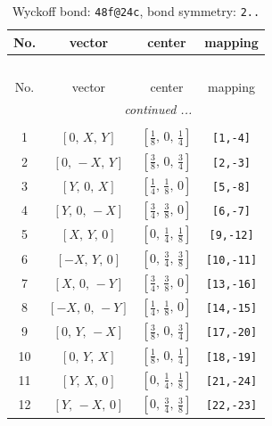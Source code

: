 \documentclass[fleqn,8pt]{jsarticle}
\begin{document}
\begin{longtable}{cccc}
\caption{Wyckoff bond: {\tt 48f@24c}, bond symmetry: {\tt 2..}}
 \\
 \hline \hline
No. & vector & center & mapping \\ \hline \endfirsthead

\multicolumn{3}{l}{\tablename\ \thetable{}} \\
 \hline \hline
No. & vector & center & mapping \\ \hline \endhead

 \hline \hline
\multicolumn{3}{r}{\footnotesize\it continued ...} \\ \endfoot

 \hline \hline
\multicolumn{3}{r}{} \\ \endlastfoot

1 & $\left[ 0,\, X,\, Y \right]$ & $\left[ \frac{1}{8},\, 0,\, \frac{1}{4} \right]$ & {\tt [1,-4]} \\ \hline
2 & $\left[ 0,\, - X,\, Y \right]$ & $\left[ \frac{3}{8},\, 0,\, \frac{3}{4} \right]$ & {\tt [2,-3]} \\ \hline
3 & $\left[ Y,\, 0,\, X \right]$ & $\left[ \frac{1}{4},\, \frac{1}{8},\, 0 \right]$ & {\tt [5,-8]} \\ \hline
4 & $\left[ Y,\, 0,\, - X \right]$ & $\left[ \frac{3}{4},\, \frac{3}{8},\, 0 \right]$ & {\tt [6,-7]} \\ \hline
5 & $\left[ X,\, Y,\, 0 \right]$ & $\left[ 0,\, \frac{1}{4},\, \frac{1}{8} \right]$ & {\tt [9,-12]} \\ \hline
6 & $\left[ - X,\, Y,\, 0 \right]$ & $\left[ 0,\, \frac{3}{4},\, \frac{3}{8} \right]$ & {\tt [10,-11]} \\ \hline
7 & $\left[ X,\, 0,\, - Y \right]$ & $\left[ \frac{3}{4},\, \frac{3}{8},\, 0 \right]$ & {\tt [13,-16]} \\ \hline
8 & $\left[ - X,\, 0,\, - Y \right]$ & $\left[ \frac{1}{4},\, \frac{1}{8},\, 0 \right]$ & {\tt [14,-15]} \\ \hline
9 & $\left[ 0,\, Y,\, - X \right]$ & $\left[ \frac{3}{8},\, 0,\, \frac{3}{4} \right]$ & {\tt [17,-20]} \\ \hline
10 & $\left[ 0,\, Y,\, X \right]$ & $\left[ \frac{1}{8},\, 0,\, \frac{1}{4} \right]$ & {\tt [18,-19]} \\ \hline
11 & $\left[ Y,\, X,\, 0 \right]$ & $\left[ 0,\, \frac{1}{4},\, \frac{1}{8} \right]$ & {\tt [21,-24]} \\ \hline
12 & $\left[ Y,\, - X,\, 0 \right]$ & $\left[ 0,\, \frac{3}{4},\, \frac{3}{8} \right]$ & {\tt [22,-23]} \\ \hline

\end{longtable}
\end{document}
